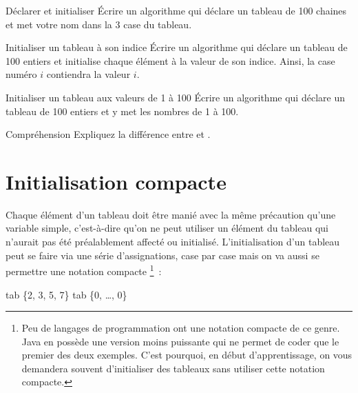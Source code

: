 		\begin{Exercice}{Déclarer et initialiser}
			Écrire un algorithme qui déclare un tableau de 100 chaines
			et met votre nom dans la 3\ieme{} case du tableau.
		\end{Exercice}
	
		\begin{Exercice}{Initialiser un tableau à son indice}
			Écrire un algorithme qui déclare un tableau de 100 entiers
			et initialise chaque élément à la valeur de son indice.
			Ainsi, la case numéro $i$ contiendra la valeur $i$.
		\end{Exercice}

		\begin{Exercice}{Initialiser un tableau aux valeurs de 1 à 100}
			Écrire un algorithme qui déclare un tableau de 100 entiers
			et y met les nombres de 1 à 100.
		\end{Exercice}

		\begin{Exercice}{Compréhension}
			Expliquez la différence entre 
			et .
		\end{Exercice}
		
	\section{Initialisation compacte}

		Chaque élément d’un tableau
		doit être manié avec la même précaution 
		qu’une variable simple, 
		c’est-à-dire qu’on ne peut utiliser un élément du tableau 
		qui n’aurait pas été préalablement affecté ou initialisé.
%
		L’initialisation d’un tableau peut se faire 
		via une série d’assignations, case par case
		mais on va aussi se permettre une notation compacte%
		\footnote{%
			Peu de langages de programmation 
			ont une notation compacte de ce genre. 
			Java en possède une version moins puissante
			qui ne permet de coder que le premier des deux exemples.
			C’est pourquoi, en début d’apprentissage, 
			on vous demandera souvent d’initialiser des tableaux
			sans utiliser cette notation compacte.
		}~:
		
		\begin{LDA}
			\Let tab \Gets \{2, 3, 5, 7\} 
			\Let tab \Gets \{0, \dots, 0\} 
		\end{LDA}

